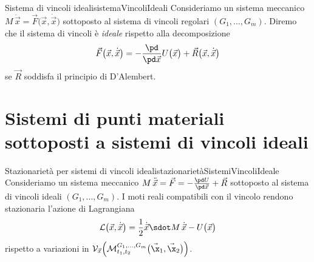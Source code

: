 \begin{defn}{Sistema di vincoli ideali}{sistemaVincoliIdeali}
	Consideriamo un sistema meccanico \(M\,\ddot{\vec{x}}=\vec{F}\big(\vec{x},\dot{\vec{x}}\big)\) sottoposto al sistema di vincoli regolari \((G_1,\ldots,G_m)\).
	Diremo che il sistema di vincoli è \emph{ideale} rispetto alla decomposizione
	\[
		\vec{F}\big(\vec{x},\dot{\vec{x}}\big) = -\frac{\pd}{\pd\vec{x}}U\big(\vec{x}\big) + \vec{R}\big(\vec{x},\dot{\vec{x}}\big)
	\]
	se \(\vec{R}\) soddisfa il principio di D'Alembert.
\end{defn}

\section{Sistemi di punti materiali sottoposti a sistemi di vincoli ideali}

\begin{teor}{Stazionarietà per sistemi di vincoli ideali}{stazionarietàSistemiVincoliIdeale}
	Consideriamo un sistema meccanico \(M\,\ddot{\vec{x}}=\vec{F} =-\frac{\pd U}{\pd\vec{x}}+\vec{R}\) sottoposto al sistema di vincoli ideali \((G_1,\ldots,G_m)\).
	I moti reali compatibili con il vincolo rendono stazionaria l'azione di Lagrangiana
	\[
		\mathcal{L}\big(\vec{x},\dot{\vec{x}}\big) = \frac{1}{2}\dot{\vec{x}} \sdot M\,\dot{\vec{x}} - U\big(\vec{x}\big)
	\]
	rispetto a variazioni in \(\mathcal{V}_{\vec{x}}\Big(\mathcal{M}_{t_1,t_2}^{G_1,\ldots,G_m}\big(\vec{\x}_1,\vec{\x}_2\big)\Big)\).
\end{teor}

